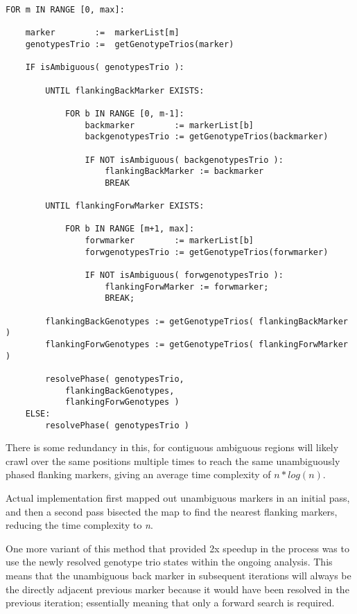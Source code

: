 \begingroup
\begin{spacing}{1}
\begin{lstlisting}[label=code:neighbouringjs]
FOR m IN RANGE [0, max]:

	marker        :=  markerList[m]
	genotypesTrio :=  getGenotypeTrios(marker)
	
	IF isAmbiguous( genotypesTrio ):	

		UNTIL flankingBackMarker EXISTS:

			FOR b IN RANGE [0, m-1]:
				backmarker        := markerList[b]
				backgenotypesTrio := getGenotypeTrios(backmarker)
				
				IF NOT isAmbiguous( backgenotypesTrio ):
					flankingBackMarker := backmarker
					BREAK
		
		UNTIL flankingForwMarker EXISTS:

			FOR b IN RANGE [m+1, max]:
				forwmarker        := markerList[b]
				forwgenotypesTrio := getGenotypeTrios(forwmarker)
				
				IF NOT isAmbiguous( forwgenotypesTrio ):
					flankingForwMarker := forwmarker;
					BREAK;

		flankingBackGenotypes := getGenotypeTrios( flankingBackMarker ) 
		flankingForwGenotypes := getGenotypeTrios( flankingForwMarker ) 

		resolvePhase( genotypesTrio, 
			flankingBackGenotypes, 
			flankingForwGenotypes )
	ELSE:
		resolvePhase( genotypesTrio )
\end{lstlisting}
\vspace{-10pt}
\end{spacing}
\endgroup

There is some redundancy in this, for contiguous ambiguous regions will likely crawl over the same positions multiple times to reach the same unambiguously phased flanking markers, giving an average time complexity of $n * log(n)$. 

Actual implementation first mapped out unambiguous markers in an initial pass, and then a second pass bisected the map to find the nearest flanking markers, reducing the time complexity to \textit{n}.

One more variant of this method that provided 2x speedup in the process was to use the newly resolved genotype trio states within the ongoing analysis. This means that the unambiguous back marker in subsequent iterations will always be the directly adjacent previous marker because it would have been resolved in the previous iteration; essentially meaning that only a forward search is required.

